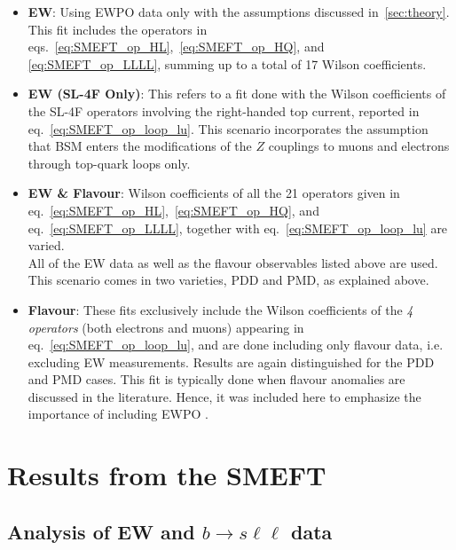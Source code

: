 \begin{itemize}
	\setlength\itemsep{0em}
	\item {\bf EW}: 
	Using EWPO data only with the assumptions discussed in~\autoref{sec:theory}. This fit includes the operators in eqs.~\eqref{eq:SMEFT_op_HL},~\eqref{eq:SMEFT_op_HQ}, and \eqref{eq:SMEFT_op_LLLL}, summing up to a total of 17 Wilson coefficients.
	\item  {\bf EW (SL-4F Only)}: This refers to a fit done with the Wilson coefficients of the { SL-4F operators} involving the right-handed top current, reported in eq.~\eqref{eq:SMEFT_op_loop_lu}. This scenario incorporates the assumption that BSM enters the modifications of the $Z$ couplings to muons and electrons through top-quark loops only.
	\item {\bf EW \& Flavour}: Wilson coefficients of all the { 21 operators} given in eq.~\eqref{eq:SMEFT_op_HL},~\eqref{eq:SMEFT_op_HQ}, and eq.~\eqref{eq:SMEFT_op_LLLL}, together with eq.~\eqref{eq:SMEFT_op_loop_lu} are varied.\\
   All of the EW data  as well as the flavour observables listed above are used. This scenario comes in two varieties, PDD and PMD, as explained above.
	\item {\bf Flavour}: These fits exclusively include the Wilson coefficients of the {\em 4 operators} (both electrons and muons) appearing in eq.~\eqref{eq:SMEFT_op_loop_lu}, and are done including only flavour data, i.e. excluding EW measurements. Results are again distinguished for the PDD and PMD cases. This fit is typically done when flavour anomalies are discussed in the literature. Hence, it was included here to emphasize the importance of including EWPO .
\end{itemize}


\section{Results from the SMEFT}
\label{sec:EFT_results}

\subsection[Analysis of EW and \texorpdfstring{$b \to s \ell \ell$}{b to s ll} data]
{Analysis of EW and \boldmath$b \to s \ell \ell$ data}
\label{sec:GEN_EFT_results}

